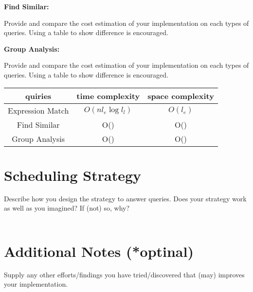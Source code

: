 \documentclass{article}
\begin{document}
\textbf{Find Similar:}

Provide and compare the cost estimation of your implementation on each types of queries. Using a table to show difference is encouraged.

\textbf{Group Analysis:}

Provide and compare the cost estimation of your implementation on each types of queries. Using a table to show difference is encouraged.

\begin{center}
    \begin{tabular}{||c c c||} 
    \hline
    \textbf{quiries} & \textbf{time complexity} & \textbf{space complexity} \\ [0.5ex] 
    \hline\hline
    Expression Match & $O(n l_e \log l_l)$ & $O(l_e)$ \\ 
    \hline
    Find Similar & O() & O() \\
    \hline
    Group Analysis & O() & O() \\
    \hline
\end{tabular}
\end{center}

\section*{Scheduling Strategy}
Describe how you design the strategy to answer queries. Does your strategy work as well as you imagined? If (not) so, why?\\ \\


\section*{Additional Notes (*optinal)}
Supply any other efforts/findings you have tried/discovered that (may) improves your implementation.
\end{document}
